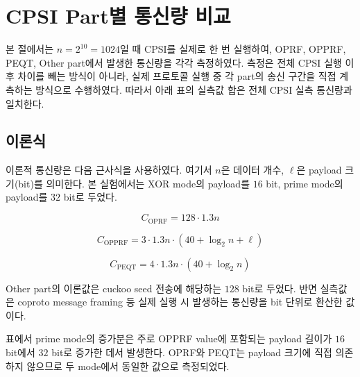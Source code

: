 \documentclass[11pt]{article}
\begin{document}
\section*{CPSI Part별 통신량 비교}

본 절에서는 \(n=2^{10}=1024\)일 때 CPSI를 실제로 한 번 실행하여,
OPRF, OPPRF, PEQT, Other part에서 발생한 통신량을 각각 측정하였다.
측정은 전체 CPSI 실행 이후 차이를 빼는 방식이 아니라, 실제 프로토콜 실행
중 각 part의 송신 구간을 직접 계측하는 방식으로 수행하였다. 따라서
아래 표의 실측값 합은 전체 CPSI 실측 통신량과 일치한다.

\subsection*{이론식}

이론적 통신량은 다음 근사식을 사용하였다. 여기서 \(n\)은 데이터 개수,
\(\ell\)은 payload 크기(bit)를 의미한다. 본 실험에서는 XOR mode의
payload를 \(16\) bit, prime mode의 payload를 \(32\) bit로 두었다.

\[
C_{\mathrm{OPRF}} = 128 \cdot 1.3n
\]

\[
C_{\mathrm{OPPRF}} = 3 \cdot 1.3n \cdot (40 + \log_2 n + \ell)
\]

\[
C_{\mathrm{PEQT}} = 4 \cdot 1.3n \cdot (40 + \log_2 n)
\]

Other part의 이론값은 cuckoo seed 전송에 해당하는 \(128\) bit로 두었다.
반면 실측값은 coproto message framing 등 실제 실행 시 발생하는 통신량을
bit 단위로 환산한 값이다.

\begin{table}[h]
\centering
\caption{Part별 이론 통신량과 XOR/prime mode 실측 통신량 비교
(\(n=2^{10}\), \(m=1305\), \(40+\log_2 m=51\) bit)}
\end{table}

표에서 prime mode의 증가분은 주로 OPPRF value에 포함되는 payload 길이가
\(16\) bit에서 \(32\) bit로 증가한 데서 발생한다. OPRF와 PEQT는 payload
크기에 직접 의존하지 않으므로 두 mode에서 동일한 값으로 측정되었다.
\end{document}
